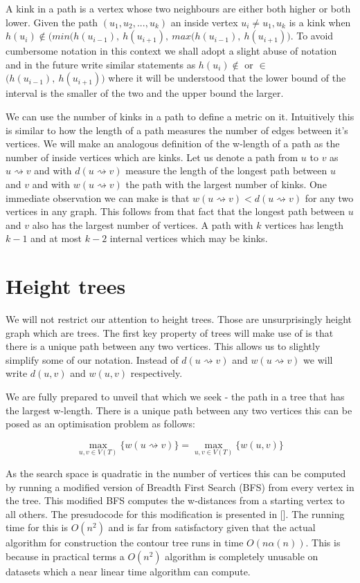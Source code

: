 A kink in a path is a vertex whose two neighbours are either both higher or both lower. Given the path $(u_1, u_2, ... , u_k)$ an inside vertex $u_i \ne u_1, u_k$ is a kink when $h(u_i) \notin \big( min(h(u_{i-1}),~h(u_{i+1}),~max(h(u_{i-1}),~h(u_{i+1}) \big)$. To avoid cumbersome notation in this context we shall adopt a slight abuse of notation and in the future write similar statements as $h(u_i) \notin $ or $ \in $ $\big(h(u_{i-1}),~h(u_{i+1}) \big)$ where it will be understood that the lower bound of the interval is the smaller of the two and the upper bound the larger.

We can use the number of kinks in a path to define a metric on it. Intuitively this is similar to how the length of a path measures the number of edges between it's vertices. We will make an analogous definition of the w-length of a path as the number of inside vertices which are kinks. Let us denote a path from $u$ to $v$ as $u \rightsquigarrow v$ and with $d(u \rightsquigarrow v)$ measure the length of the longest path between $u$ and $v$ and with $w(u \rightsquigarrow v)$ the path with the largest number of kinks. One immediate observation we can make is that $w(u \rightsquigarrow v) < d(u \rightsquigarrow v)$ for any two vertices in any graph. This follows from that fact that the longest path between $u$ and $v$ also has the largest number of vertices. A path with $k$ vertices has length $k-1$ and at most $k-2$ internal vertices which may be kinks.


\section{Height trees}

We will not restrict our attention to height trees. Those are unsurprisingly height graph which are trees. The first key property of trees will make use of is that there is a unique path between any two vertices. This allows us to slightly simplify some of our notation.  Instead of  $d(u \rightsquigarrow v)$ and $w(u \rightsquigarrow v)$ we will write $d(u, v)$ and $w(u, v)$ respectively.  

We are fully prepared to unveil that which we seek - the path in a tree that has the largest w-length. There is a unique path between any two vertices this can be posed as an optimisation problem as follows:

$$ \max_{u, v \in V(T)}\{ w(u \rightsquigarrow v) \} =  \max_{u, v \in V(T)}\{ w(u, v) \} $$

As the search space is quadratic in the number of vertices this can be computed by running a modified version of Breadth First Search (BFS) from every vertex in the tree. This modified BFS computes the w-distances from a starting vertex to all others. The presudocode for this modification is presented in []. The running time for this is $O(n^2)$ and is far from satisfactory given that the actual algorithm for construction the contour tree runs in time $O(n\alpha(n))$. This is because in practical terms a $O(n^2)$ algorithm is completely unusable on datasets which a near linear time algorithm can compute.

